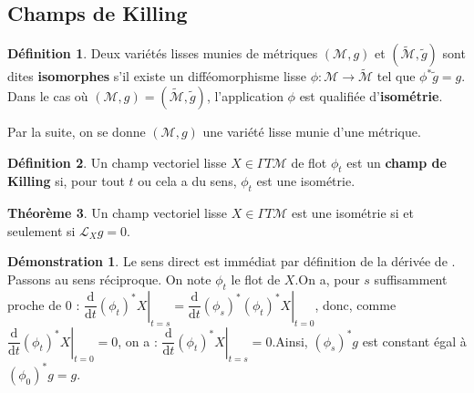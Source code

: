 \documentclass[12pt,a4paper]{article}
\theoremstyle{definition}
\newtheorem{thm}{Théorème}
\newtheorem{defn}[thm]{Définition}
\newtheorem*{dem}{Démonstration}
\begin{document}
\subsection{Champs de Killing}
\begin{defn}
Deux variétés lisses munies de métriques $(\mathcal{M},g)$ et $\left(\widetilde{\mathcal{M}},\widetilde{g}\right)$ sont dites \textbf{isomorphes} s'il existe un difféomorphisme lisse $\phi:\mathcal{M}\to\widetilde{\mathcal{M}}$ tel que $\phi^*\widetilde{g}=g$.\newline
Dans le cas où $(\mathcal{M},g)=(\widetilde{\mathcal{M}},\widetilde{g})$, l'application $\phi$ est qualifiée d'\textbf{isométrie}.
\end{defn}
Par la suite, on se donne $(\mathcal{M},g)$ une variété lisse munie d'une métrique.
\begin{defn}
Un champ vectoriel lisse $X\in \Gamma T\mathcal{M}$ de flot $\phi_t$ est un \textbf{champ de Killing} si, pour tout $t$ ou cela a du sens, $\phi_t$ est une isométrie.
\end{defn}
\begin{thm}
Un champ vectoriel lisse $X\in\Gamma T\mathcal{M}$ est une isométrie si et seulement si $\mathcal{L}_Xg=0$.
\end{thm}
\begin{dem}
Le sens direct est immédiat par définition de la dérivée de .\newline
Passons au sens réciproque. On note $\phi_t$ le flot de $X$.\newline On a, pour $s$ suffisamment proche de $0$ : $\left.\dfrac{\mathrm{d}}{\mathrm{d}t}\left(\phi_t\right)^*X\right|_{t=s}=\left.\dfrac{\mathrm{d}}{\mathrm{d}t}\left(\phi_s\right)^*(\phi_t)^*X\right|_{t=0}$, donc, comme $\left.\dfrac{\mathrm{d}}{\mathrm{d}t}(\phi_t)^*X\right|_{t=0}=0$, on a : $\left.\dfrac{\mathrm{d}}{\mathrm{d}t}\left(\phi_t\right)^*X\right|_{t=s}=0$.\newline Ainsi, $\left(\phi_s\right)^*g$ est constant égal à $\left(\phi_0\right)^*g=g$.
\end{dem}
\newpage
\end{document}
